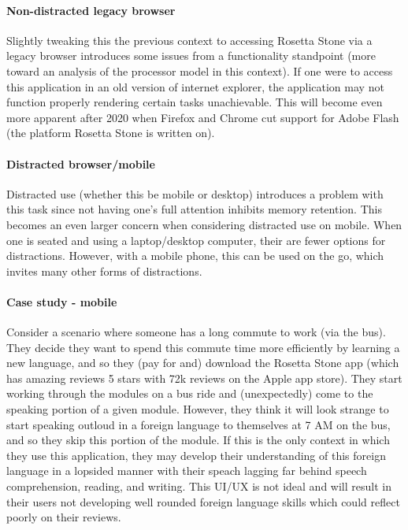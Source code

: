 \paragraph{Non-distracted legacy browser}
Slightly tweaking this the previous context to accessing Rosetta Stone via a legacy browser introduces some issues from a functionality standpoint (more toward an analysis of the processor model in this context). If one were to access this application in an old version of internet explorer, the application may not function properly rendering certain tasks unachievable. This will become even more apparent after 2020 when Firefox and Chrome cut support for Adobe Flash (the platform Rosetta Stone is written on).

\paragraph{Distracted browser/mobile}
Distracted use (whether this be mobile or desktop) introduces a problem with this task since not having one's full attention inhibits memory retention. This becomes an even larger concern when considering distracted use on mobile. When one is seated and using a laptop/desktop computer, their are fewer options for distractions. However, with a mobile phone, this can be used on the go, which invites many other forms of distractions.

\paragraph{Case study - mobile}
Consider a scenario where someone has a long commute to work (via the bus). They decide they want to spend this commute time more efficiently by learning a new language, and so they (pay for and) download the Rosetta Stone app (which has amazing reviews 5 stars with 72k reviews on the Apple app store). They start working through the modules on a bus ride and (unexpectedly) come to the speaking portion of a given module. However, they think it will look strange to start speaking outloud in a foreign language to themselves at 7 AM on the bus, and so they skip this portion of the module. If this is the only context in which they use this application, they may develop their understanding of this foreign language in a lopsided manner with their speach lagging far behind speech comprehension, reading, and writing. This UI/UX is not ideal and will result in their users not developing well rounded foreign language skills which could reflect poorly on their reviews.


